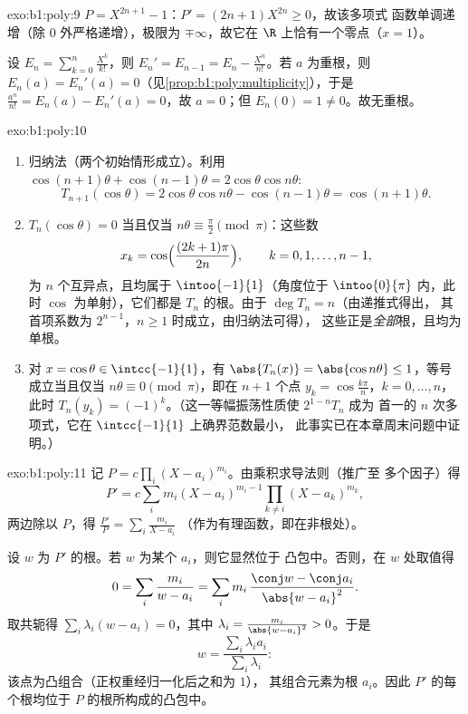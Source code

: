 \begin{solution}{exo:b1:poly:9}
$P = X^{2n+1} - 1$：$P' = (2n+1)X^{2n} \geq 0$，故该多项式
函数单调递增（除 $0$ 外严格递增），极限为
$\mp\infty$，故它在 $\R$ 上恰有一个零点（$x = 1$）。

设 $E_n = \sum_{k=0}^{n} \frac{X^k}{k!}$，则 $E_n' = E_{n-1} = E_n
- \frac{X^n}{n!}$。若 $a$ 为重根，则 $E_n(a) =
E_n'(a) = 0$（见\cref{prop:b1:poly:multiplicity}），于是
$\frac{a^n}{n!} = E_n(a) - E_n'(a) = 0$，故 $a = 0$；但 $E_n(0) = 1
\neq 0$。故无重根。
\end{solution}

\begin{solution}{exo:b1:poly:10}
\begin{enumerate}
  \item 归纳法（两个初始情形成立）。利用 $\cos(n+1)\theta +
        \cos(n-1)\theta = 2\cos\theta\cos n\theta$:
        \[
        T_{n+1}(\cos\theta) = 2\cos\theta \cos n\theta -
        \cos(n-1)\theta = \cos(n+1)\theta .
        \]
  \item $T_n(\cos\theta) = 0$ 当且仅当 $n\theta \equiv \frac\pi2 \pmod
        \pi$：这些数
        \[
        x_k = \cos\Bigl(\frac{(2k+1)\pi}{2n}\Bigr),
        \qquad k = 0, 1, \dots, n-1,
        \]
        为 $n$ 个互异点，且均属于 $\intoo{-1}{1}$（角度位于
        $\intoo{0}{\pi}$ 内，此时 $\cos$ 为单射），它们都是
        $T_n$ 的根。由于 $\deg T_n = n$（由递推式得出，
        其首项系数为 $2^{n-1}$，$n \geq 1$ 时成立，由归纳法可得），
        这些正是\emph{全部}根，且均为单根。
  \item 对 $x = \cos\theta \in \intcc{-1}{1}$，有 $\abs{T_n(x)} =
        \abs{\cos n\theta} \leq 1$，等号成立当且仅当 $n\theta \equiv
        0 \pmod\pi$，即在 $n+1$ 个点 $y_k =
        \cos\frac{k\pi}{n}$，$k = 0, \dots, n$，此时 $T_n(y_k) =
        (-1)^k$。（这一等幅振荡性质使 $2^{1-n}T_n$ 成为
        首一的 $n$ 次多项式，它在
        $\intcc{-1}{1}$ 上确界范数最小，
        此事实已在本章周末问题中证明。）
\end{enumerate}
\end{solution}

\begin{solution}{exo:b1:poly:11}
记 $P = c\prod_i (X - a_i)^{m_i}$。由乘积求导法则（推广至
多个因子）得
\[
P' = c\sum_{i} m_i (X - a_i)^{m_i - 1} \prod_{k \neq i} (X -
a_k)^{m_k},
\]
两边除以 $P$，得 $\frac{P'}{P} = \sum_i \frac{m_i}{X - a_i}$
（作为有理函数，即在非根处）。

设 $w$ 为 $P'$ 的根。若 $w$ 为某个 $a_i$，则它显然位于
凸包中。否则，在 $w$ 处取值得
\[
0 = \sum_i \frac{m_i}{w - a_i}
= \sum_i m_i\, \frac{\conj w - \conj a_i}{\abs{w - a_i}^2} .
\]
取共轭得 $\sum_i \lambda_i (w - a_i) = 0$，其中 $\lambda_i =
\frac{m_i}{\abs{w - a_i}^2} > 0$。于是
\[
w = \frac{\sum_i \lambda_i a_i}{\sum_i \lambda_i} :
\]
该点为凸组合（正权重经归一化后之和为 $1$），
其组合元素为根 $a_i$。因此 $P'$ 的每个根均位于
$P$ 的根所构成的凸包中。
\end{solution}

